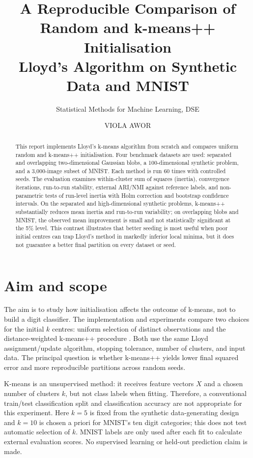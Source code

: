 \documentclass[10pt,a4paper]{article}
\title{\textbf{A Reproducible Comparison of Random and k-means++ Initialisation}\\
\large Lloyd's Algorithm on Synthetic Data and MNIST}
\author{Statistical Methods for Machine Learning, DSE}
\date{VIOLA AWOR}
\begin{document}
\maketitle
\begin{abstract}
This report implements Lloyd's k-means algorithm from scratch and compares uniform random and k-means++ initialisation. Four benchmark datasets are used: separated and overlapping two-dimensional Gaussian blobs, a 100-dimensional synthetic problem, and a 3,000-image subset of MNIST. Each method is run 60 times with controlled seeds. The evaluation examines within-cluster sum of squares (inertia), convergence iterations, run-to-run stability, external ARI/NMI against reference labels, and non-parametric tests of run-level inertia with Holm correction and bootstrap confidence intervals. On the separated and high-dimensional synthetic problems, k-means++ substantially reduces mean inertia and run-to-run variability; on overlapping blobs and MNIST, the observed mean improvement is small and not statistically significant at the 5\% level. This contrast illustrates that better seeding is most useful when poor initial centres can trap Lloyd's method in markedly inferior local minima, but it does not guarantee a better final partition on every dataset or seed.
\end{abstract}
\tableofcontents
\newpage

\section{Aim and scope}
The aim is to study how initialisation affects the outcome of k-means, not to build a digit classifier. The implementation and experiments compare two choices for the initial $k$ centres: uniform selection of distinct observations and the distance-weighted k-means++ procedure \cite{arthur2007kmeans}. Both use the same Lloyd assignment/update algorithm, stopping tolerance, number of clusters, and input data. The principal question is whether k-means++ yields lower final squared error and more reproducible partitions across random seeds.

K-means is an unsupervised method: it receives feature vectors $X$ and a chosen number of clusters $k$, but not class labels when fitting. Therefore, a conventional train/test classification split and classification accuracy are not appropriate for this experiment. Here $k=5$ is fixed from the synthetic data-generating design and $k=10$ is chosen a priori for MNIST's ten digit categories; this does not test automatic selection of $k$. MNIST labels are only used after each fit to calculate external evaluation scores. No supervised learning or held-out prediction claim is made.
\end{document}
